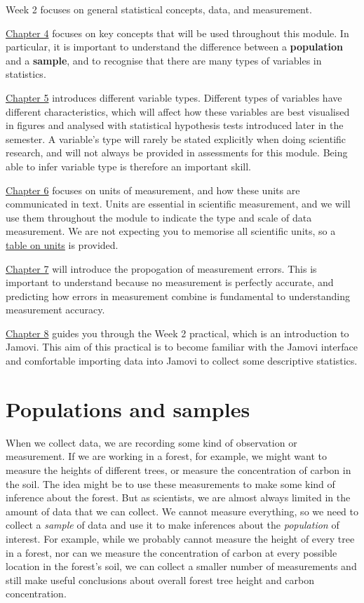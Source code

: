 \documentclass[
]{scrbook}
\begin{document}
Week 2 focuses on general statistical concepts, data, and measurement.

\protect\hyperlink{Chapter_4}{Chapter 4} focuses on key concepts that will be used throughout this module.
In particular, it is important to understand the difference between a \textbf{population} and a \textbf{sample}, and to recognise that there are many types of variables in statistics.

\protect\hyperlink{Chapter_5}{Chapter 5} introduces different variable types. Different types of variables have different characteristics, which will affect how these variables are best visualised in figures and analysed with statistical hypothesis tests introduced later in the semester.
A variable's type will rarely be stated explicitly when doing scientific research, and will not always be provided in assessments for this module.
Being able to infer variable type is therefore an important skill.

\protect\hyperlink{Chapter_6}{Chapter 6} focuses on units of measurement, and how these units are communicated in text.
Units are essential in scientific measurement, and we will use them throughout the module to indicate the type and scale of data measurement.
We are not expecting you to memorise all scientific units, so a \protect\hyperlink{appendixA_units}{table on units} is provided.

\protect\hyperlink{Chapter_7}{Chapter 7} will introduce the propogation of measurement errors.
This is important to understand because no measurement is perfectly accurate, and predicting how errors in measurement combine is fundamental to understanding measurement accuracy.

\protect\hyperlink{Chapter_8}{Chapter 8} guides you through the Week 2 practical, which is an introduction to Jamovi.
This aim of this practical is to become familiar with the Jamovi interface and comfortable importing data into Jamovi to collect some descriptive statistics.

\hypertarget{Chapter_4}{%
\chapter{Populations and samples}\label{Chapter_4}}

When we collect data, we are recording some kind of observation or measurement.
If we are working in a forest, for example, we might want to measure the heights of different trees, or measure the concentration of carbon in the soil.
The idea might be to use these measurements to make some kind of inference about the forest.
But as scientists, we are almost always limited in the amount of data that we can collect.
We cannot measure everything, so we need to collect a \emph{sample} of data and use it to make inferences about the \emph{population} of interest.
For example, while we probably cannot measure the height of every tree in a forest, nor can we measure the concentration of carbon at every possible location in the forest's soil, we can collect a smaller number of measurements and still make useful conclusions about overall forest tree height and carbon concentration.
\end{document}
